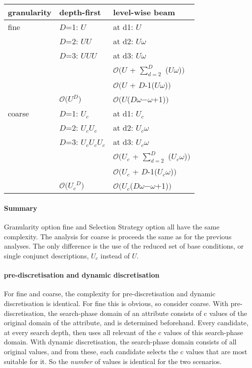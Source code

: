 \documentclass[a4paper]{article}
\newcommand{\D}{D}
\newcommand{\uu}{$U$}
\newcommand{\uc}{$U_c$}
\newcommand{\bw}{$\omega$}
\newcommand{\co}[1]{$\mathcal{O}($#1$)$}
\begin{document}
\begin{table}[!h]
\centering
\begin{tabular}{lll}
granularity & depth-first         & level-wise beam\\
\hline
fine        & $\D$=1: \uu         & at d1: \uu\\
            & $\D$=2: \uu \uu     & at d2: \uu \bw\\
            & $\D$=3: \uu \uu \uu & at d3: \uu \bw\\
            &                     & \co{\uu{} + $\sum_{d=2}^\D$ (\uu \bw)}\\
            &                     & \co{\uu{} + $\D${-}1(\uu \bw)}\\
            & \co{\uu{}$^\D$}     & \co{\uu{}($D$\bw$-$\bw+1)}\\
\hline
coarse      & $\D$=1: \uc         & at d1: \uc\\
            & $\D$=2: \uc \uc     & at d2: \uc \bw\\
            & $\D$=3: \uc \uc \uc & at d3: \uc \bw\\
            &                     & \co{\uc{} + $\sum_{d=2}^\D$ (\uc \bw)}\\
            &                     & \co{\uc{} + $\D${-}1(\uc \bw)}\\
            & \co{\uc{}$^\D$}     & \co{\uc{}($D$\bw$-$\bw+1)}\\
\end{tabular}
\end{table}

\paragraph{Summary}
Granularity option fine and Selection Strategy option all have the same complexity.
The analysis for coarse is proceeds the same as for the previous analyses.
The only difference is the use of the reduced set of base conditions, or single conjunct descriptions, \uc{} instead of \uu{}.

\paragraph{pre-discretisation and dynamic discretisation}
For fine and coarse, the complexity for pre-discretisation and dynamic discretisation is identical.
For fine this is obvious, so consider coarse.
With pre-discretisation, the search-phase domain of an attribute consists of c values of the original domain of the attribute, and is determined beforehand.
Every candidate, at every search depth, then uses all relevant of the c values of this search-phase domain.
With dynamic discretisation, the search-phase domain consists of all original values, and from these, each candidate selects the c values that are most suitable for it.
So the \emph{number} of values is identical for the two scenarios.
\end{document}
